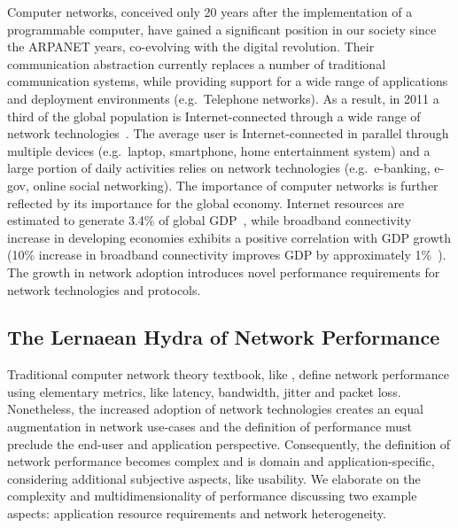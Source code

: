 Computer networks, conceived only 20 years after the implementation of a
programmable computer, have gained a significant position in our society since
the ARPANET years, co-evolving with the digital revolution.  Their communication
abstraction currently replaces a number of traditional communication systems,
while providing support for a wide range of applications and deployment
environments (e.g.~Telephone networks).  As a result, in 2011 a third of the
global population is Internet-connected through a wide range of network
technologies~.  The average user is
Internet-connected in parallel through multiple devices (e.g.~laptop, smartphone, home
entertainment system) and a large portion of daily activities relies on network
technologies (e.g.~e-banking, e-gov, online social networking). The importance
of computer networks is further reflected by its importance for the global
economy. Internet resources are estimated to generate 3.4\% of global
GDP~, while broadband connectivity increase in developing
economies exhibits a positive correlation with GDP growth (10\% increase in
broadband connectivity improves GDP by approximately 1\%~).  The
growth in network adoption introduces novel performance requirements for network
technologies and protocols.  

\subsection{The Lernaean Hydra of Network Performance} \label{sec:intro:perf_complexity}


Traditional computer network theory textbook, like ,
define network performance using elementary metrics, like latency, bandwidth,
jitter and packet loss. Nonetheless, the increased adoption of network
technologies creates an equal augmentation in network use-cases and the
definition of performance must preclude the end-user and application
perspective.  Consequently, the definition of network performance becomes
complex and is domain and application-specific, considering additional
subjective aspects, like usability.  We elaborate on the complexity and
multidimensionality of performance discussing two example aspects: application
resource requirements and network heterogeneity. 

